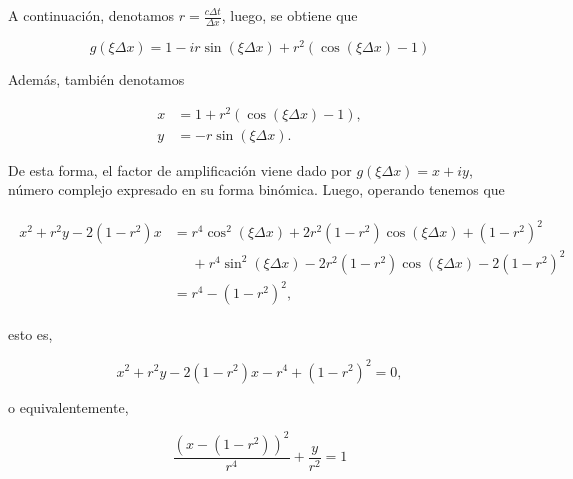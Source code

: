 \begin{example}
  A continuación, denotamos
  \begin{math}
    r=
    \frac{c\Delta t}{\Delta x}
  \end{math},
  luego, se obtiene que

  \begin{equation*}
    g
    \left(\xi\Delta x\right)=
    1-ir\sin
    \left(\xi\Delta x\right)+
    r^{2}
    \left(
    \cos
    \left(
      \xi\Delta x
      \right)-1
    \right)
  \end{equation*}

  Además, también denotamos

  \begin{align*}
    x & =
    1+
    r^{2}
    \left(
    \cos\left(\xi \Delta x\right)-
    1
    \right), \\
    y & =
    -r
    \sin
    \left(\xi\Delta x\right).
  \end{align*}

  De esta forma, el factor de amplificación viene dado por
  \begin{math}
    g\left(
    \xi\Delta x
    \right)=
    x+iy
  \end{math},
  número complejo expresado en su forma binómica.
  Luego, operando tenemos que

  \begin{gather*}
    \begin{split}
      x^{2}+
      r^{2}y-
      2\left(1-r^{2}\right)x
       & =
      r^{4}\cos^{2}
      \left(\xi\Delta x\right)+
      2r^{2}
      \left(1-r^{2}\right)
      \cos\left(\xi\Delta x\right)+
      {\left(1-r^{2}\right)}^{2}  \\
       & \phantom{=}
      +r^{4}
      \sin^{2}
      (\xi \Delta x)-
      2r^{2}
      \left(1-r^{2}\right)
      \cos\left(\xi\Delta x\right)-
      2{\left(1-r^{2}\right)}^{2} \\
       & =
      r^{4}-
      {\left(1-r^{2}\right)}^{2},
    \end{split}
  \end{gather*}

  esto es,

  \begin{equation*}
    x^{2}+
    r^{2}y-
    2\left(1-r^{2}\right)x-
    r^{4}+
    {\left(1-r^{2}\right)}^{2}=
    0,
  \end{equation*}

  o equivalentemente,

  \begin{equation*}
    \frac{{\left(x-\left(1-r^{2}\right)\right)}^{2}}{r^{4}}+
    \frac{y}{r^{2}}=
    1
  \end{equation*}


\end{example}
